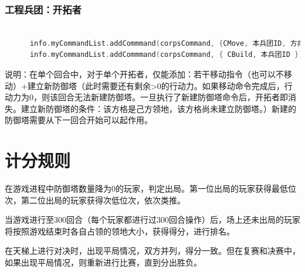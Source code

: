\documentclass[a4paper,4pt]{article}
\begin{document}
\subsubsection{工程兵团：开拓者}
\begin{lstlisting}[language={C++}]  %插入代码块
          
      info.myCommandList.addCommmand(corpsCommand, {CMove, 本兵团ID, 方向(Cup / Cdown / Cleft / Cright)})  //移动
      info.myCommandList.addCommmand(corpsCommand, { CBuild, 本兵团ID })  //建立新防御塔
\end{lstlisting}
说明：在单个回合中，对于单个开拓者，仅能添加：若干移动指令（也可以不移动）+建立新防御塔（此时需要还有剩余>0的行动力。如果移动命令完成后，行动力为0，则该回合无法新建防御塔。一旦执行了新建防御塔命令后，开拓者即消失。建立新防御塔的条件：该方格是己方领地，该方格尚未建立防御塔。）新建的防御塔需要从下一回合开始可以起作用。

\section{计分规则}
在游戏进程中防御塔数量降为0的玩家，判定出局。第一位出局的玩家获得最低位次，第二位出局的玩家获得次低位次，依次类推。\par
当游戏进行至300回合（每个玩家都进行过300回合操作）后，场上还未出局的玩家将按照游戏结束时各自占领的领地大小，获得得分，进行排名。\par
在天梯上进行对决时，出现平局情况，双方并列，得分一致。但在复赛和决赛中，如果出现平局情况，则重新进行比赛，直到分出胜负。
\end{document}
